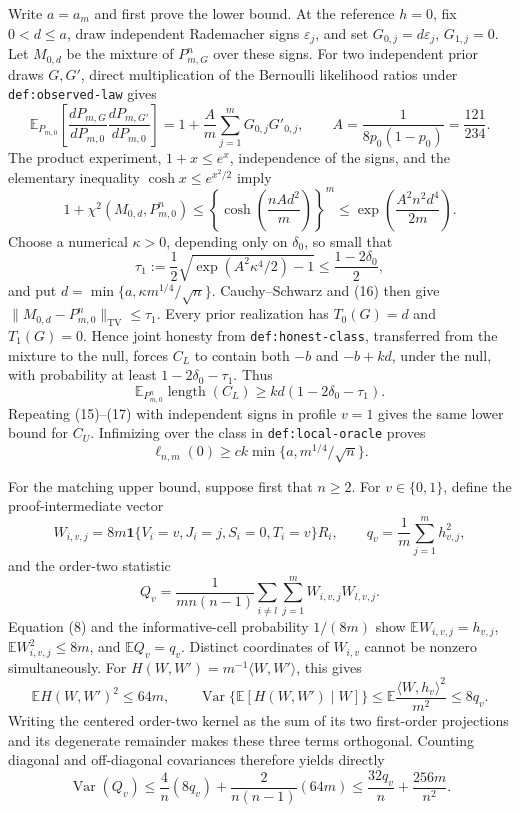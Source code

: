 Write \(a=a_m\) and first prove the lower bound.  At the reference \(h=0\),
fix \(0<d\le a\), draw independent Rademacher signs \(\varepsilon_j\), and
set \(G_{0,j}=d\varepsilon_j\), \(G_{1,j}=0\).  Let \(M_{0,d}\) be the
mixture of \(P_{m,G}^n\) over these signs.  For two independent prior draws
\(G,G'\), direct multiplication of the Bernoulli likelihood ratios under
\texttt{def:observed-law} gives
\[
 \mathbb E_{P_{m,0}}
 \left[\frac{dP_{m,G}}{dP_{m,0}}
       \frac{dP_{m,G'}}{dP_{m,0}}\right]
 =1+\frac{A}{m}\sum_{j=1}^mG_{0,j}G'_{0,j},
 \qquad A=\frac1{8p_0(1-p_0)}=\frac{121}{234}.                           \tag{15}
\]
The product experiment, \(1+x\le e^x\), independence of the signs, and
the elementary inequality \(\cosh x\le e^{x^2/2}\) imply
\[
 1+\chi^2(M_{0,d},P_{m,0}^n)
 \le\left\{\cosh\left(\frac{nAd^2}{m}\right)\right\}^{m}
 \le\exp\left(\frac{A^2n^2d^4}{2m}\right).                              \tag{16}
\]
Choose a numerical \(\kappa>0\), depending only on \(\delta_0\), so small
that
\[
 \tau_1:=\frac12\sqrt{\exp(A^2\kappa^4/2)-1}
 \le\frac{1-2\delta_0}{2},
\]
and put \(d=\min\{a,\kappa m^{1/4}/\sqrt n\}\).  Cauchy--Schwarz and (16)
then give \(\|M_{0,d}-P_{m,0}^n\|_{\mathrm{TV}}\le\tau_1\).
Every prior realization has \(T_0(G)=d\) and \(T_1(G)=0\).  Hence joint
honesty from \texttt{def:honest-class}, transferred from the mixture to the
null, forces \(C_L\) to contain both \(-b\) and \(-b+kd\), under the null,
with probability at least \(1-2\delta_0-\tau_1\).  Thus
\[
 \mathbb E_{P_{m,0}^n}\operatorname{length}(C_L)
 \ge kd(1-2\delta_0-\tau_1).                                             \tag{17}
\]
Repeating (15)--(17) with independent signs in profile \(v=1\) gives the
same lower bound for \(C_U\).  Infimizing over the class in
\texttt{def:local-oracle} proves
\[
 \ell_{n,m}(0)\ge c k\min\{a,m^{1/4}/\sqrt n\}.                           \tag{18}
\]

For the matching upper bound, suppose first that \(n\ge2\).  For
\(v\in\{0,1\}\), define the proof-intermediate vector
\[
 W_{i,v,j}=8m\mathbf1\{V_i=v,J_i=j,S_i=0,T_i=v\}R_i,
 \qquad q_v=\frac1m\sum_{j=1}^mh_{v,j}^2,
\]
and the order-two statistic
\[
 Q_v=\frac1{mn(n-1)}\sum_{i\ne l}\sum_{j=1}^mW_{i,v,j}W_{l,v,j}.          \tag{19}
\]
Equation (8) and the informative-cell probability \(1/(8m)\) show
\(\mathbb EW_{i,v,j}=h_{v,j}\), \(\mathbb EW_{i,v,j}^2\le8m\), and
\(\mathbb EQ_v=q_v\).  Distinct coordinates of \(W_{i,v}\) cannot be
nonzero simultaneously.  For \(H(W,W')=m^{-1}\langle W,W'\rangle\), this
gives
\[
 \mathbb EH(W,W')^2\le64m,
 \qquad
 \operatorname{Var}\{\mathbb E[H(W,W')\mid W]\}
 \le\mathbb E\frac{\langle W,h_v\rangle^2}{m^2}\le8q_v.                 \tag{20}
\]
Writing the centered order-two kernel as the sum of its two first-order
projections and its degenerate remainder makes these three terms orthogonal.
Counting diagonal and off-diagonal covariances therefore yields directly
\[
 \operatorname{Var}(Q_v)
 \le\frac{4}{n}(8q_v)+\frac{2}{n(n-1)}(64m)
 \le\frac{32q_v}{n}+\frac{256m}{n^2}.                                   \tag{21}
\]

